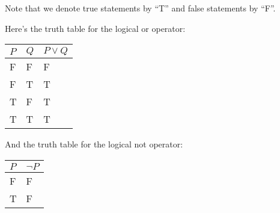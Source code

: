 Note that we denote true statements by ``T'' and false statements by ``F''.

Here's the truth table for the logical or operator:
\begin{table}[h]
    \centering
    \begin{tabular}{|l|l||l|}
        \hline
        $P$ & $Q$ & $P\lor Q$ \\ \hline
        F   & F   & F         \\ \hline
        F   & T   & T         \\ \hline
        T   & F   & T         \\ \hline
        T   & T   & T         \\ \hline
    \end{tabular}
\end{table}

And the truth table for the logical not operator:
\begin{table}[h]
    \centering
    \begin{tabular}{|l||l|}
        \hline
        $P$ & $\lnot P$ \\ \hline
        F   & F         \\ \hline
        T   & F         \\ \hline
    \end{tabular}
\end{table}

